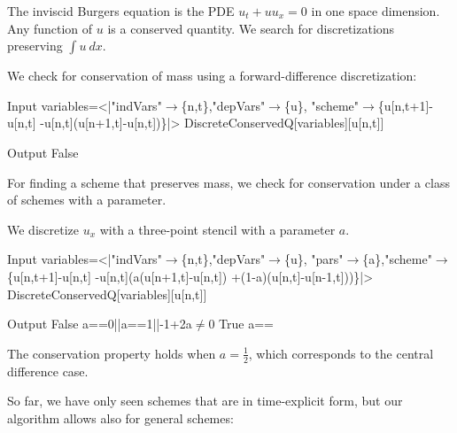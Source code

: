 \documentclass[runningheads]{llncs}
\newcommand{\1}{\chi}
\begin{document}
The inviscid Burgers equation is the PDE $u_t+uu_x=0$ \cite{smoller94} in one space dimension. Any function of $u$ is a conserved quantity. We search for discretizations preserving $\int u\ dx$.
\begin{example}
	We check for conservation of mass using a forward-difference discretization:
	
	\begin{small}
		\begin{mmaCell}[moredefined={variables, expression, DiscreteConservedQ}]{Input}
  variables=<|"indVars"\(\pmb{\to}\)\{n,t\},"depVars"\(\pmb{\to}\)\{u\},
  "scheme"\(\pmb{\to}\)\{u[n,t+1]-u[n,t]
  -u[n,t](u[n+1,t]-u[n,t])\}|>
  DiscreteConservedQ[variables][u[n,t]]
  
\end{mmaCell}
		\begin{mmaCell}{Output}
  False
\end{mmaCell}
	\end{small}
\end{example}
For finding a scheme that preserves mass, we check for conservation under a class of schemes with a parameter.
\begin{example}
	We discretize $u_x$ with a three-point stencil with a parameter $a$.
	
	\begin{small}
		\begin{mmaCell}[moredefined={variables, expression, DiscreteConservedQ}]{Input}
  variables=<|"indVars"\(\pmb{\to}\)\{n,t\},"depVars"\(\pmb{\to}\)\{u\},
  "pars"\(\pmb{\to}\)\{a\},"scheme"\(\pmb{\to}\)\{u[n,t+1]-u[n,t]
  -u[n,t](a(u[n+1,t]-u[n,t])
  +(1-a)(u[n,t]-u[n-1,t]))\}|>
  DiscreteConservedQ[variables][u[n,t]]
  
\end{mmaCell}
		\begin{mmaCell}{Output}
  False		a==0||a==1||-1+2a\(\neq\)0
  True		a==\mmaFrac{1}{2}
  
\end{mmaCell}
	\end{small}
The conservation property holds when $a=\frac{1}{2}$, which corresponds to the central difference case.
\end{example}
So far, we have only seen schemes that are in time-explicit form, but our algorithm allows also for general schemes:
\end{document}
